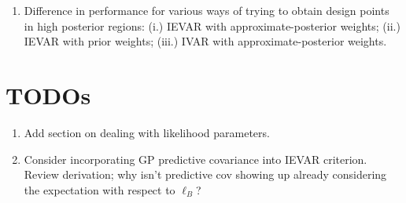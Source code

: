 \documentclass[12pt]{article}
\begin{document}
\begin{enumerate} 
\item Difference in performance for various ways of trying to obtain design points in high posterior regions: (i.) IEVAR with approximate-posterior 
weights; (ii.) IEVAR with prior weights; (iii.) IVAR with approximate-posterior weights. 
\end{enumerate}


\section{TODOs}
\begin{enumerate}
\item Add section on dealing with likelihood parameters. 
\item Consider incorporating GP predictive covariance into IEVAR criterion. Review derivation; why isn't predictive cov showing up already considering the 
expectation with respect to $\ell_B$? 
\end{enumerate}

 

\end{document}

